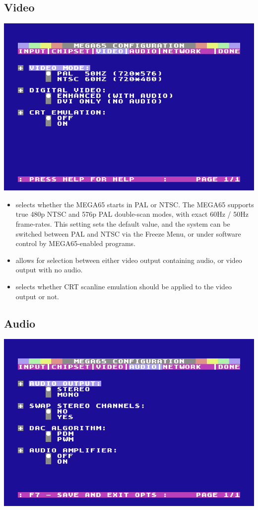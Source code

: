 \subsection{Video}

\begin{center}
\includegraphics[width=0.7\linewidth]{images/ss-m65config-3.png}
\end{center}
\begin{itemize}
  \item {} selects whether the MEGA65 starts in PAL or NTSC.    The MEGA65 supports true 480p NTSC and 576p PAL double-scan modes, with exact 60Hz / 50Hz frame-rates. This setting sets the default value, and the system can be switched between PAL and NTSC via the Freeze Menu, or under software control by MEGA65-enabled programs.
  \item {} allows for selection between either  video output containing audio, or  video output with no audio.
  \item {} selects whether CRT scanline emulation should be applied to the video output or not.
\end{itemize}

\subsection{Audio}

\begin{center}
\includegraphics[width=0.7\linewidth]{images/ss-m65config-4.png}
\end{center}

